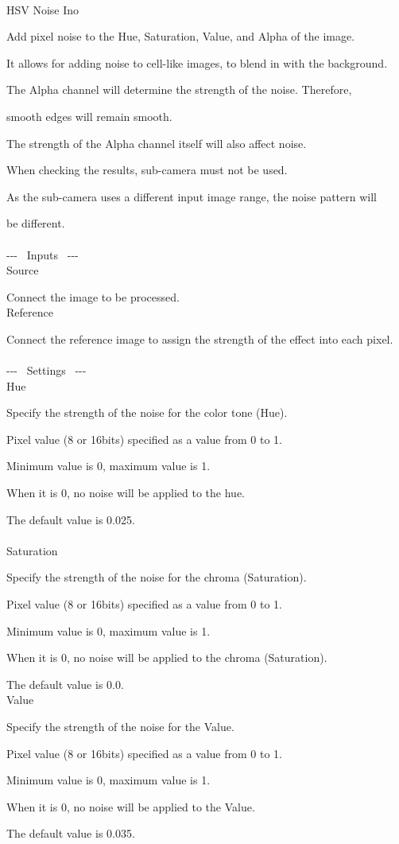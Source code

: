\documentclass[a4paper,12pt]{article}
\begin{document}
\thispagestyle{empty}

\Large
\noindent \\
HSV Noise Ino\medskip
\par
\normalsize
Add pixel noise to the Hue, Saturation, Value, and Alpha of the image.\par
It allows for adding noise to cell-like images, to blend in with the background.\\
\par
The Alpha channel will determine the strength of the noise. Therefore,\par
smooth edges will remain smooth.\par
The strength of the Alpha channel itself will also affect noise.\\
\par
When checking the results, sub-camera must not be used.\par
As the sub-camera uses a different input image range, the noise pattern will\par
be different.\\
\\
-{-}- \ Inputs \ -{-}-\\
Source\par
Connect the image to be processed.\\
Reference\par
Connect the reference image to assign the strength of the effect into each pixel.\\
\\
-{-}- \ Settings \ -{-}-\\
Hue\par
Specify the strength of the noise for the color tone (Hue).\par
Pixel value (8 or 16bits) specified as a value from 0 to 1.\par
Minimum value is 0, maximum value is 1.\par
When it is 0, no noise will be applied to the hue.\par
The default value is 0.025.\\
\\
Saturation\par
Specify the strength of the noise for the chroma (Saturation).\par
Pixel value (8 or 16bits) specified as a value from 0 to 1.\par
Minimum value is 0, maximum value is 1.\par
When it is 0, no noise will be applied to the chroma (Saturation).\par
The default value is 0.0.
\\
Value\par
Specify the strength of the noise for the Value.\par
Pixel value (8 or 16bits) specified as a value from 0 to 1.\par
Minimum value is 0, maximum value is 1.\par
When it is 0, no noise will be applied to the Value.\par
The default value is 0.035.\\
\end{document}

